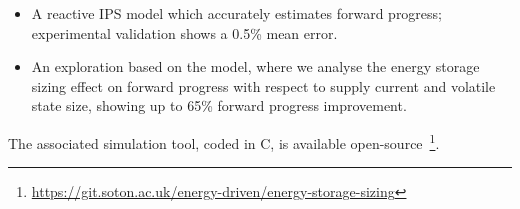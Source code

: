 \begin{itemize}
    \item A reactive IPS model which accurately estimates forward progress; experimental validation shows a 0.5\% mean error. 
	\item An exploration based on the model, where we analyse the energy storage sizing effect on forward progress with respect to supply current and volatile state size, showing up to 65\% forward progress improvement.


    

\end{itemize}
The associated simulation tool, coded in C, is available open-source~\footnote{\url{https://git.soton.ac.uk/energy-driven/energy-storage-sizing}}. %

